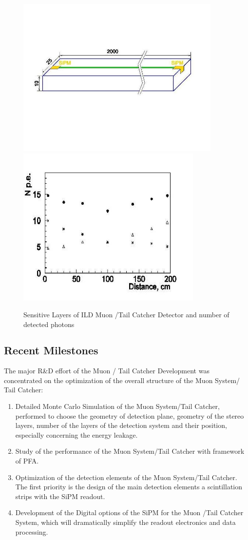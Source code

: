 \begin{figure}
	\centering
\includegraphics[height=8cm]{MuonDetector/MuonDetectorILD/Sc_strip.jpg}
\includegraphics[height=8cm]{MuonDetector/MuonDetectorILD/Sc_strip_photons.jpg}
	\caption{Sensitive Layers of ILD Muon /Tail Catcher Detector and number of detected photons}
	\label{fig:ild:muon:concept}
\end{figure}

\subsection{Recent Milestones}
The major R\&D effort of the Muon / Tail Catcher Development was concentrated on the optimization of the overall structure of the Muon System/ Tail Catcher:
\begin{enumerate}
\item Detailed Monte Carlo Simulation of the Muon System/Tail Catcher, performed to choose the geometry of detection plane, geometry of the stereo layers, number of the layers of the detection system and their position, especially concerning the energy leakage.
\item Study of the performance of the Muon System/Tail Catcher with framework of PFA.
\item Optimization of the detection elements of the Muon System/Tail Catcher. The first priority is the design of the main detection elements a scintillation strips with the SiPM readout.
\item Development of the Digital options of the SiPM for the Muon /Tail Catcher System, which will dramatically simplify the readout electronics and data processing.
\end{enumerate}

